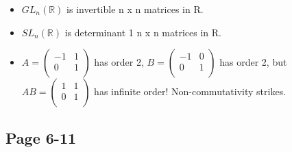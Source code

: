 \documentclass[11pt, oneside]{article}   	%
\begin{document}
\begin{itemize}
\item $GL_n(\mathbb{R})$ is invertible n x n matrices in R.
\item $SL_n(\mathbb{R})$ is determinant 1 n x n matrices in R.
\item 
 
$A = \begin{pmatrix}
    -1      & 1 \\
    0       & 1 \\

\end{pmatrix}
$
has order 2,  $B = \begin{pmatrix}
    -1      & 0 \\
   0      & 1 \\

\end{pmatrix}$
has order 2,  but $AB = \begin{pmatrix}
    1       & 	1 \\
    0      & 1\\

\end{pmatrix}$ has infinite order!  Non-commutativity strikes.

\end{itemize}


\subsection {Page 6-11}
\end{document}
